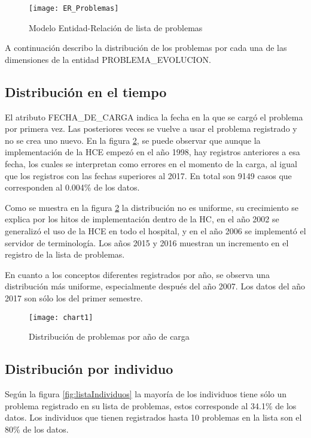 \begin{figure}[htbp]
\caption{Modelo Entidad-Relación de lista de problemas}
\label{fig:ModeloER}
\centering
\texttt{[image: ER\_Problemas]}
\end{figure}

 A continuación describo la distribución de los problemas por cada una de las dimensiones de la entidad PROBLEMA\_EVOLUCION. 
 
\subsection{Distribución en el tiempo}
El atributo FECHA\_DE\_CARGA indica la fecha en la que se cargó el problema por primera vez. Las posteriores veces se vuelve a usar el problema registrado y no se crea uno nuevo. En la figura \ref{fig:registrosYConceptos}, se puede observar que aunque la implementación de la \acrshort{HCE} empezó en el año 1998, hay registros anteriores a esa fecha, los cuales se interpretan como errores en el momento de la carga, al igual que los registros con las fechas superiores al 2017. En total son \num{9149} casos que corresponden al \num{0,004}\% de los datos.

Como se muestra en la figura \ref{fig:registrosYConceptos} la distribución no es uniforme, su crecimiento se explica por los hitos de implementación dentro de la HC, en el año \num{2002} se generalizó el uso de la HCE en todo el hospital, y en el año \num{2006} se implementó el servidor de terminología. Los años \num{2015} y \num{2016} muestran un incremento en el registro de la lista de problemas.

En cuanto a los conceptos diferentes registrados por año, se observa una distribución más uniforme, especialmente después del año \num{2007}. Los datos del año 2017 son sólo los del primer semestre.

\begin{figure}[htbp]
\caption{Distribución de problemas por año de carga}
\label{fig:registrosYConceptos}
\centering
\texttt{[image: chart1]}
\end{figure}

\subsection{Distribución por individuo}
Según la figura \ref{fig:listaIndividuos} la mayoría de los individuos tiene sólo un problema registrado en su lista de problemas, estos corresponde al \num{34.1}\% de los datos. Los individuos que tienen registrados hasta 10 problemas en la lista son el \num{80}\% de los datos.

